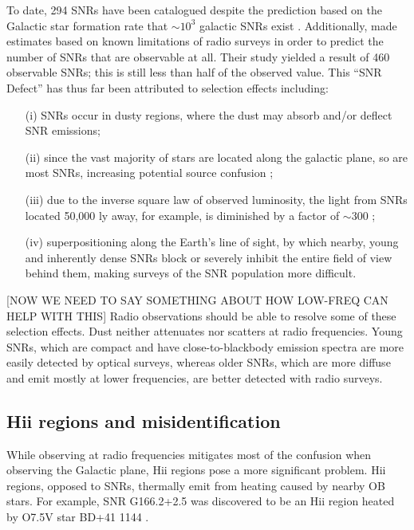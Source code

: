 \documentclass[useAMS,usenatbib]{mn2e}
\begin{document}
To date, 294 SNRs have been catalogued \citep{DAGreen.14} despite the prediction based on the Galactic star formation rate that $\sim10^3$ galactic SNRs exist \citep{Li.91,Pavlovic.13}.  
Additionally, \cite{Brogan.06} made estimates based on known limitations of radio surveys in order to predict the number of SNRs that are observable at all.
Their study yielded a result of 460 observable SNRs; this is still less than half of the observed value. 
This “SNR Defect” has thus far been attributed to selection effects including: 
\begin{itemize}
\item[(i)] SNRs occur in dusty regions, where the dust may absorb and/or deflect SNR emissions;
\item[(ii)] since the vast majority of stars are located along the galactic plane, so are most SNRs, increasing potential source confusion \citep[e.g.][]{Gao_v.11,Gao_vi.11};
\item[(iii)] due to the inverse square law of observed luminosity,%
the light from SNRs located 50,000 ly away, for example, is diminished by a factor of $\sim$300  \citep{Green.91};
\item[(iv)] superpositioning along the Earth’s line of sight, by which nearby, young  and inherently dense SNRs block or severely inhibit the entire field of view behind them, making surveys of the SNR population more difficult. 
\end{itemize}

{\color{red}[NOW WE NEED TO SAY SOMETHING ABOUT HOW LOW-FREQ CAN HELP WITH THIS]}
Radio observations should be able to resolve some of these selection effects. Dust neither attenuates nor scatters at radio frequencies. Young SNRs, which are compact and have close-to-blackbody emission spectra are more easily detected by optical surveys, whereas older SNRs, which are more diffuse and emit mostly at lower frequencies, are better detected with radio surveys.

\subsection{H{\sc ii} regions and misidentification}
While observing at radio frequencies mitigates most of the confusion when observing the Galactic plane, H{\sc ii} regions pose a more significant problem.  H{\sc ii} regions, opposed to SNRs, thermally emit from heating caused by nearby OB stars. %
For example, SNR G166.2+2.5 was discovered to be an H{\sc ii} region heated by O7.5V star BD+41 1144 \citep{Foster.06}.  
\end{document}
